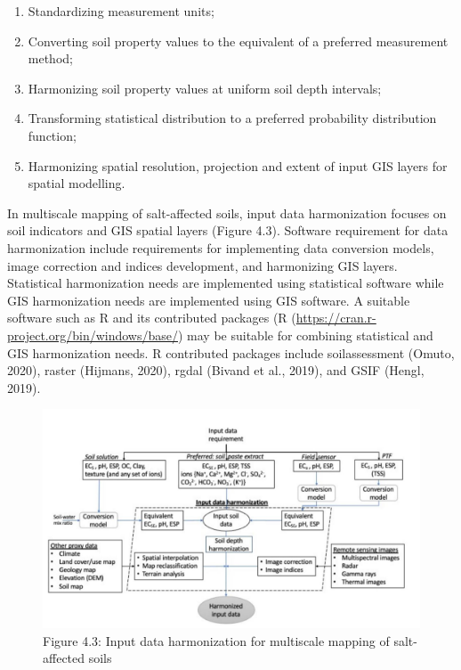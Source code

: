\documentclass[
  10pt,
  b5paper,
]{book}
\providecommand{\tightlist}{%
  \setlength{\itemsep}{0pt}\setlength{\parskip}{0pt}}
\begin{document}
\begin{enumerate}
\def\labelenumi{\alph{enumi})}
\tightlist
\item
  Standardizing measurement units;\\
\item
  Converting soil property values to the equivalent of a preferred measurement method;\\
\item
  Harmonizing soil property values at uniform soil depth intervals;\\
\item
  Transforming statistical distribution to a preferred probability distribution function;\\
\item
  Harmonizing spatial resolution, projection and extent of input GIS layers for spatial modelling.
\end{enumerate}

In multiscale mapping of salt-affected soils, input data harmonization focuses on soil indicators and GIS spatial layers (Figure 4.3). Software requirement for data harmonization include requirements for implementing data conversion models, image correction and indices development, and harmonizing GIS layers. Statistical harmonization needs are implemented using statistical software while GIS harmonization needs are implemented using GIS software. A suitable software such as R and its contributed packages (R (\url{https://cran.r-project.org/bin/windows/base/}) may be suitable for combining statistical and GIS harmonization needs. R contributed packages include soilassessment (Omuto, 2020), raster (Hijmans, 2020), rgdal (Bivand et al., 2019), and GSIF (Hengl, 2019).

\begin{figure}
\centering
\includegraphics{figures/images/Figure4.3.jpg}
\caption{Figure 4.3: Input data harmonization for multiscale mapping of salt-affected soils}
\end{figure}
\end{document}

